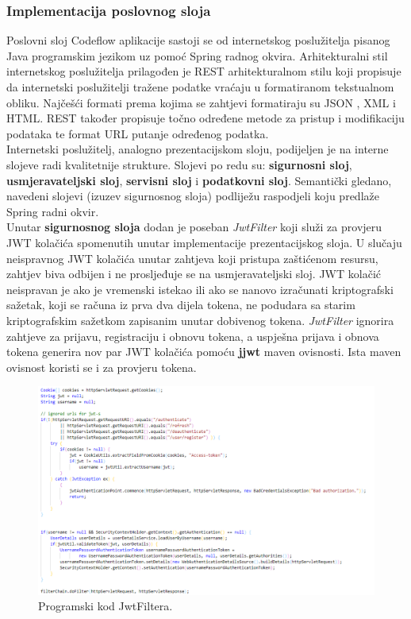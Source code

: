 \documentclass[times, utf8, zavrsni, numeric]{fer}
\begin{document}
	 		\subsubsection{Implementacija poslovnog sloja}
	 		Poslovni sloj Codeflow aplikacije sastoji se od internetskog poslužitelja pisanog Java programskim jezikom uz pomoć Spring radnog okvira. Arhitekturalni stil internetskog poslužitelja prilagođen je REST\cite{rest2021}  arhitekturalnom stilu koji propisuje da internetski poslužitelji tražene podatke vraćaju u formatiranom tekstualnom obliku. Najčešći formati prema kojima se zahtjevi formatiraju su JSON , XML  i HTML. REST također propisuje točno određene metode za pristup i modifikaciju podataka te format URL putanje određenog podatka.\\ Internetski poslužitelj, analogno prezentacijskom sloju, podijeljen je na interne slojeve radi kvalitetnije strukture. Slojevi po redu su: \textbf{sigurnosni sloj}, \textbf{usmjeravateljski sloj}, \textbf{servisni sloj} i \textbf{podatkovni sloj}. Semantički gledano, navedeni slojevi (izuzev sigurnosnog sloja) podliježu raspodjeli koju predlaže Spring radni okvir.\\
	 		Unutar \textbf{sigurnosnog sloja} dodan je poseban \textit{JwtFilter} koji služi za provjeru JWT kolačića spomenutih unutar implementacije prezentacijskog sloja. U slučaju neispravnog JWT kolačića unutar zahtjeva koji pristupa zaštićenom resursu, zahtjev biva odbijen i ne prosljeđuje se na usmjeravateljski sloj. JWT kolačić neispravan je ako je vremenski istekao ili ako se nanovo izračunati kriptografski sažetak, koji se računa  iz prva dva dijela tokena, ne podudara sa starim kriptografskim sažetkom zapisanim unutar dobivenog tokena. \textit{JwtFilter} ignorira zahtjeve za prijavu, registraciju i obnovu tokena, a uspješna prijava i obnova tokena generira nov par JWT kolačića pomoću \textbf{jjwt}\cite{jjwt2021} maven ovisnosti. Ista maven ovisnost koristi se i za provjeru tokena.
	 		\begin{figure}[H]
	 			\centering
	 			\includegraphics[width=\linewidth]{pictures/prikazi/JwtFilter.png}
	 			\caption{Programski kod JwtFiltera.}
	 			\label{fig:jwtfilter}
	 		\end{figure}
 		
\end{document}
